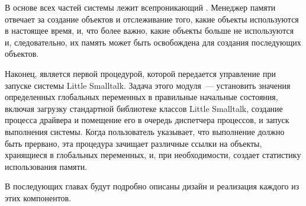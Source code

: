 В основе всех частей системы лежит всепроникающий .
Менеджер памяти отвечает за создание объектов и отслеживание того, какие объекты
используются в настоящее время, и, что более важно, какие объекты больше не
используются и, следовательно, их память может быть освобождена для создания
последующих объектов.

Наконец,  является первой процедурой,
которой передается управление при запуске системы Little Smalltalk. Задача этого
модуля\ --- установить значения определенных глобальных переменных в правильные
начальные состояния, включая загрузку стандартной библиотеке классов Little
Smalltalk, создание процесса драйвера и помещение его в очередь диспетчера
процессов, и запуск выполнения системы. Когда пользователь указывает, что
выполнение должно быть прервано, эта процедура зачищает различные ссылки на
объекты, хранящиеся в глобальных переменных, и, при необходимости, создает
статистику использования памяти.

В последующих главах будут подробно описаны дизайн и реализация каждого из этих
компонентов.
